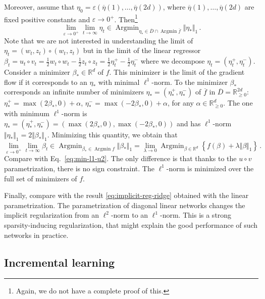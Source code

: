 \documentclass[11pt,reqno]{article}
\DeclareMathOperator*{\Argmin}{Argmin}
\newcommand{\R}{\mathbb{R}}
\renewcommand{\geq}{\geqslant}
\numberwithin{equation}{section}
\theoremstyle{plain}
\theoremstyle{definition}
\theoremstyle{remark}
\begin{document}
Moreover, assume that $\eta_0 = \varepsilon (\overline{\eta}(1), \dots, \overline{\eta}(2d))$, where $\overline{\eta}(1), \dots, \overline{\eta}(2d)$ are fixed positive constants and $\varepsilon \to 0^+$. Then\footnote{Again, we do not have a complete proof of this.}
\begin{equation*}
	\lim_{\varepsilon \to 0^+} \lim_{t \to \infty} \eta_t \in  \Argmin_{\eta_* \in \overline{D} \cap \Argmin \overline{f}} \Vert \eta_* \Vert_1 \, .
\end{equation*}
Note that we are not interested in understanding the limit of $\eta_t = (w_t, z_t) \circ (w_t, z_t)$ but in the limit of the linear regressor $\beta_t = u_t \circ v_t = \frac{1}{2} w_t \circ w_t - \frac{1}{2} z_t \circ z_t = \frac{1}{2} \eta_t^+ - \frac{1}{2} \eta_t^-$ where we decompose $\eta_t = (\eta_t^+, \eta_t^-)$. Consider a minimizer $\beta_* \in \R^d$ of $f$. This minimizer is the limit of the gradient flow if it corresponds to an $\eta_*$ with minimal $\ell^1$-norm. To the minimizer $\beta_*$ corresponds an infinite number of minimizers $\eta_*= (\eta_*^+, \eta_*^-)$ of $\overline{f}$ in $\overline{D} = \R_{\geq 0}^{2d}$: $\eta_*^+ = \max(2\beta_*, 0) + \alpha$, $\eta_*^- = \max(-2\beta_*, 0) + \alpha$, for any $\alpha \in \R_{\geq 0}^d$. The one with minimum $\ell^1$-norm is $\eta_* = (\eta_*^+, \eta_*^-) = (\max(2\beta_*, 0), \max(-2\beta_*, 0))$ and has $\ell^1$-norm $\Vert \eta_* \Vert_1 = 2 \Vert \beta_* \Vert_1$. Minimizing this quantity, we obtain that 
\begin{equation*}
	\lim_{\varepsilon \to 0^+} \lim_{t \to \infty} \beta_t \in  \Argmin_{\beta_* \in \Argmin f} \Vert \beta_* \Vert_1 = \lim_{\lambda \to 0} \Argmin_{\beta \in \R^d} \left\{ f(\beta) + \lambda \Vert \beta \Vert_1 \right\} \, .
\end{equation*} 
Compare with Eq.~\eqref{eq:min-l1-u2}. The only difference is that thanks to the $u\circ v$ parametrization, there is no sign constraint. The $\ell^1$-norm is minimized over the full set of minimizers of $f$.

Finally, compare with the result \eqref{eq:implicit-reg-ridge} obtained with the linear parametrization. The parametrization of diagonal linear networks changes the implicit regularization from an $\ell^2$-norm to an $\ell^1$-norm. This is a strong sparsity-inducing regularization, that might explain the good performance of such networks in practice.

\subsection{Incremental learning}
\end{document}
